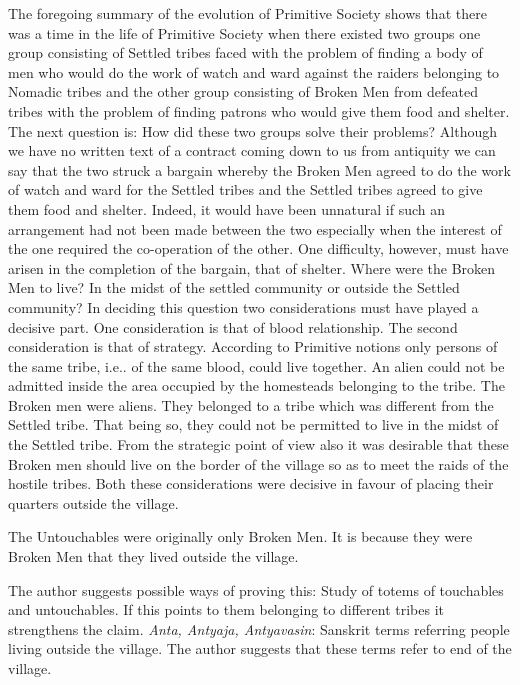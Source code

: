 \documentclass{article}
\begin{document}
\begin{shadequote}
The foregoing summary of the evolution of Primitive Society shows that there was a time in the life of Primitive Society when there existed two groups one group consisting of Settled tribes faced with the problem of finding a body of men who would do the work of watch and ward against the raiders belonging to Nomadic tribes and the other group consisting of Broken Men from defeated tribes with the problem of finding patrons who would give them food and shelter.
The next question is: How did these two groups solve their problems? Although we have no written text of a contract coming down to us from antiquity we can say that the two struck a bargain whereby the Broken Men agreed to do the work of watch and ward for the Settled tribes and the Settled tribes agreed to give them food and shelter. Indeed, it would have been unnatural if such an arrangement had not been made between the two especially when the interest of the one required the co-operation of the other.
One difficulty, however, must have arisen in the completion of the bargain, that of shelter. Where were the Broken Men to live? In the midst of the settled community or outside the Settled community? In deciding this question two considerations must have played a decisive part. One consideration is that of blood relationship. The second consideration is that of strategy. According to Primitive notions only persons of the same tribe, i.e.. of the same blood, could live together. An alien could not be admitted inside the area occupied by the homesteads belonging to the tribe. The Broken men were aliens. They belonged to a tribe which was different from the Settled tribe. That being so, they could not be permitted to live in the midst of the Settled tribe. From the strategic point of view also it was desirable that these Broken men should live on the border of the village so as to meet the raids of the hostile tribes. Both these considerations were decisive in favour of placing their quarters outside the village.

The Untouchables were originally only Broken Men. It is because they were Broken Men that they lived outside the village.
\end{shadequote}

The author suggests possible ways of proving this: Study of totems of touchables and untouchables. If this points to them belonging to different tribes  it strengthens the claim.
\emph{Anta, Antyaja, Antyavasin}: Sanskrit terms referring people living outside the village. The author suggests that these terms refer to end of the village.
\end{document}
